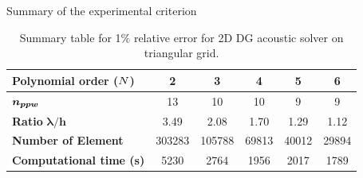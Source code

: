\begin{frame}{Summary of the experimental criterion}
  \small
      \hspace{-1cm}
  \begin{table}[!htbp]
    \begin{tabular}{|l|c|c|c|c|c|}
    \hline
        \textbf{Polynomial order (${N}$)} & 2 & 3 & 4 & 5 & 6 \\ \hline
        $\boldsymbol{n_{ppw}}$  & 13 & 10 & 10 & 9 & 9 \\ \hline
        \textbf{Ratio} $\boldsymbol{\lambda/h}$ & 3.49 & 2.08 & 1.70 & 1.29 & 1.12 \\ \hline
        \textbf{Number of Element} & 303283 & 105788 & 69813 & 40012 & 29894 \\ \hline
        \textbf{Computational time (s)} & 5230 & 2764 & 1956 & 2017  & 1789\\ \hline
    \end{tabular}
    \caption{Summary table for 1$\%$ relative error for 2D DG acoustic solver on triangular grid.}
    \label{recap_ppw}
  \end{table}
\end{frame}

